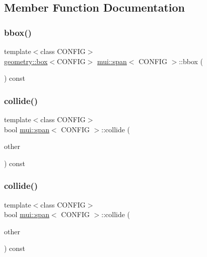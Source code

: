\subsection{Member Function Documentation}
\mbox{\label{classmui_1_1span_a15a9322c12cffb05745ba5f6036a9238}} 
\subsubsection{\texorpdfstring{bbox()}{bbox()}}
{\footnotesize\ttfamily template$<$class C\+O\+N\+F\+IG$>$ \\
\hyperlink{classmui_1_1geometry_1_1box}{geometry\+::box}$<$C\+O\+N\+F\+IG$>$ \hyperlink{classmui_1_1span}{mui\+::span}$<$ C\+O\+N\+F\+IG $>$\+::bbox (\begin{DoxyParamCaption}{ }\end{DoxyParamCaption}) const\hspace{0.3cm}{\ttfamily [inline]}}

\mbox{\label{classmui_1_1span_a70eb8c64b35137c63b1862f94ddcc6a5}} 
\subsubsection{\texorpdfstring{collide()}{collide()}\hspace{0.1cm}{\footnotesize\ttfamily [1/2]}}
{\footnotesize\ttfamily template$<$class C\+O\+N\+F\+IG$>$ \\
bool \hyperlink{classmui_1_1span}{mui\+::span}$<$ C\+O\+N\+F\+IG $>$\+::collide (\begin{DoxyParamCaption}\item[{const \hyperlink{classmui_1_1geometry_1_1any__shape}{geometry\+::any\+\_\+shape}$<$ C\+O\+N\+F\+IG $>$ \&}]{other }\end{DoxyParamCaption}) const\hspace{0.3cm}{\ttfamily [inline]}}

\mbox{\label{classmui_1_1span_aac34fb8df6ebc8ae9eed782f7e6141ea}} 
\subsubsection{\texorpdfstring{collide()}{collide()}\hspace{0.1cm}{\footnotesize\ttfamily [2/2]}}
{\footnotesize\ttfamily template$<$class C\+O\+N\+F\+IG$>$ \\
bool \hyperlink{classmui_1_1span}{mui\+::span}$<$ C\+O\+N\+F\+IG $>$\+::collide (\begin{DoxyParamCaption}\item[{const \hyperlink{classmui_1_1span}{span}$<$ C\+O\+N\+F\+IG $>$ \&}]{other }\end{DoxyParamCaption}) const\hspace{0.3cm}{\ttfamily [inline]}}

